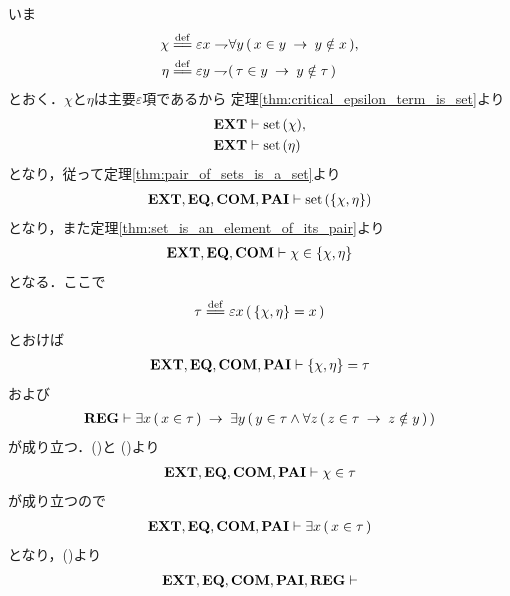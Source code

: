 	\begin{sketch}
		いま
		\begin{align}
			\chi &\defeq \varepsilon x \negation \forall y\, (\, x \in y \rarrow y \notin x\, ), \\
			\eta &\defeq \varepsilon y \negation (\, \tau \in y \rarrow y \notin \tau\, )
		\end{align}
		とおく．$\chi$と$\eta$は主要$\varepsilon$項であるから
		定理\ref{thm:critical_epsilon_term_is_set}より
		\begin{align}
			\mbox{{\bf EXT}} &\vdash \operatorname*{set}\hspace{0.15em}(\chi), \\
			\mbox{{\bf EXT}} &\vdash \operatorname*{set}\hspace{0.15em}(\eta)
		\end{align}
		となり，従って定理\ref{thm:pair_of_sets_is_a_set}より
		\begin{align}
			\mbox{{\bf EXT}},\mbox{{\bf EQ}},\mbox{\bf COM},\mbox{{\bf PAI}} \vdash \operatorname*{set}\hspace{0.15em}(\{\chi,\eta\})
		\end{align}
		となり，また定理\ref{thm:set_is_an_element_of_its_pair}より
		\begin{align}
			\mbox{{\bf EXT}},\mbox{{\bf EQ}},\mbox{\bf COM} \vdash \chi \in \{\chi,\eta\}
			\label{fom:no_pair_of_sets_go_round_1}
		\end{align}
		となる．ここで
		\begin{align}
			\tau \defeq \varepsilon x\, (\, \{\chi,\eta\} = x\, )
		\end{align}
		とおけば
		\begin{align}
			\mbox{{\bf EXT}},\mbox{{\bf EQ}},\mbox{\bf COM},\mbox{{\bf PAI}} \vdash \{\chi,\eta\} = \tau
			\label{fom:no_pair_of_sets_go_round_2}
		\end{align}
		および
		\begin{align}
			\mbox{{\bf REG}} \vdash \exists x\, (\, x \in \tau\, ) 
			\hspace{0.25em}\rightarrow\hspace{0.25em} \exists y\, (\, y \in \tau \wedge \forall z\, (\, z \in \tau 
			\hspace{0.25em}\rightarrow\hspace{0.25em} z \notin y\, )\, )
			\label{fom:no_pair_of_sets_go_round_3}
		\end{align}
		が成り立つ．()と
		()より
		\begin{align}
			\mbox{{\bf EXT}},\mbox{{\bf EQ}},\mbox{\bf COM},\mbox{{\bf PAI}} \vdash \chi \in \tau
			\label{fom:no_pair_of_sets_go_round_6}
		\end{align}
		が成り立つので%
		\begin{align}
			\mbox{{\bf EXT}},\mbox{{\bf EQ}},\mbox{\bf COM},\mbox{{\bf PAI}} \vdash \exists x\, (\, x \in \tau\, )
		\end{align}
		となり，()より
		\begin{align}
			\EXTAX,\EQAX,\COMAX,\PAIAX,\REGAX \vdash

\end{align}
\end{sketch}

